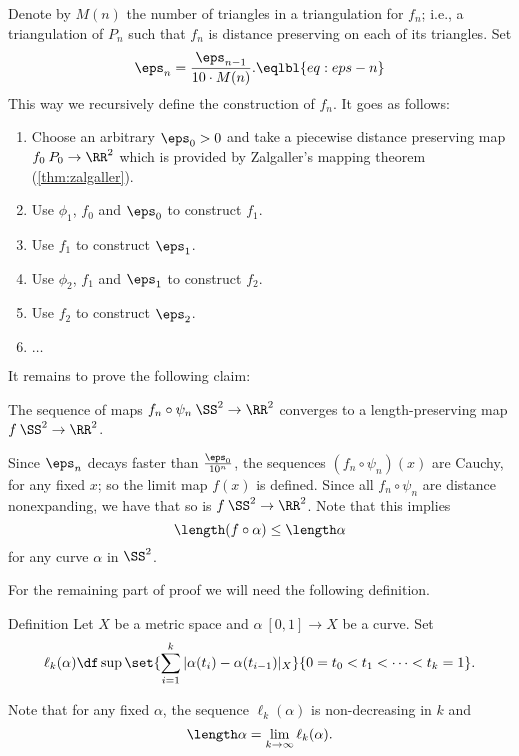 Denote by $M(n)$ the number of triangles in a triangulation for $f_n$;
i.e., a triangulation of $P_n$ such that $f_n$ is distance preserving on each of its triangles. 
Set 
$$\eps_{n}=\frac{\eps_{n-1}}{10\cdot M(n)}.\eqlbl{eq:eps-n}$$
This way we recursively define the construction of $f_n$.
It goes as follows: 
\begin{enumerate}
\item Choose an arbitrary $\eps_0>0$ and take a piecewise distance preserving map $f_0\:P_0\to\RR^2$ which is provided by Zalgaller's mapping theorem (\ref{thm:zalgaller}).
\item Use $\phi_1$, $f_0$ and $\eps_0$ to construct $f_1$.
\item Use $f_1$ to construct $\eps_1$.
\item Use $\phi_2$, $f_1$ and $\eps_1$ to construct $f_2$.
\item Use $f_2$ to construct $\eps_2$.
\item $\dots$
\end{enumerate}
 

\medskip



It remains to prove the following claim:

\begin{clm}{}
The sequence of maps $f_n\circ\psi_n\:\SS^2\to \RR^2$ converges to a length-preserving map $f\:\SS^2\to\RR^2$. 
\end{clm}

Since $\eps_{n}$ decays faster than $\tfrac{\eps_0}{10^n}$, 
the sequences $(f_n\circ\psi_n)(x)$ are Cauchy,
for any fixed $x$;
so the limit map $f(x)$ is defined.
Since all $f_n\circ\psi_n$ are distance nonexpanding, we have that so is $f\:\SS^2\to\RR^2$.  Note that this implies $$\length (f\circ\alpha) \leq \length \alpha$$ for any curve $\alpha$ in $\SS^2$.

For the remaining part of proof we will need the following definition.

\begin{thm}{Definition}
Let $X$ be a metric space and $\alpha\:[0,1]\to X$
be a curve.
Set 
$$\ell_k(\alpha)
\df
\sup\set{\sum_{i=1}^k |\alpha(t_i)-\alpha(t_{i-1})|_X}{0=t_0<t_1<\dots<t_k=1}.$$

\end{thm}

Note that for any fixed $\alpha$,
the sequence $\ell_k(\alpha)$ is non-decreasing in $k$ and
$$
\length\alpha=\lim_{k\to\infty}\ell_k(\alpha).$$


